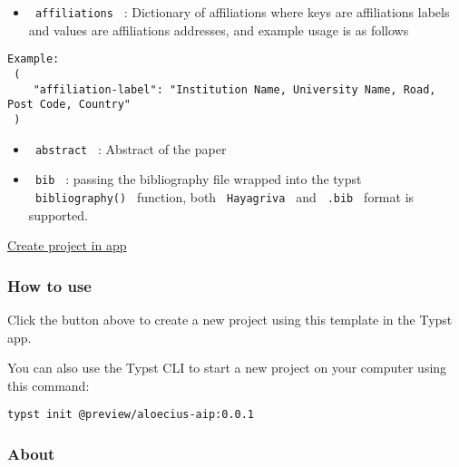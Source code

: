\begin{itemize}
\tightlist
\item
  \texttt{\ affiliations\ } : Dictionary of affiliations where keys are
  affiliations labels and values are affiliations addresses, and example
  usage is as follows
\end{itemize}

\begin{verbatim}
Example:
 (
    "affiliation-label": "Institution Name, University Name, Road, Post Code, Country"
 )
\end{verbatim}

\begin{itemize}
\tightlist
\item
  \texttt{\ abstract\ } : Abstract of the paper
\item
  \texttt{\ bib\ } : passing the bibliography file wrapped into the
  typst \texttt{\ bibliography()\ } function, both
  \texttt{\ Hayagriva\ } and \texttt{\ .bib\ } format is supported.
\end{itemize}

\href{/app?template=aloecius-aip&version=0.0.1}{Create project in app}

\subsubsection{How to use}\label{how-to-use}

Click the button above to create a new project using this template in
the Typst app.

You can also use the Typst CLI to start a new project on your computer
using this command:

\begin{verbatim}
typst init @preview/aloecius-aip:0.0.1
\end{verbatim}



\subsubsection{About}\label{about}

